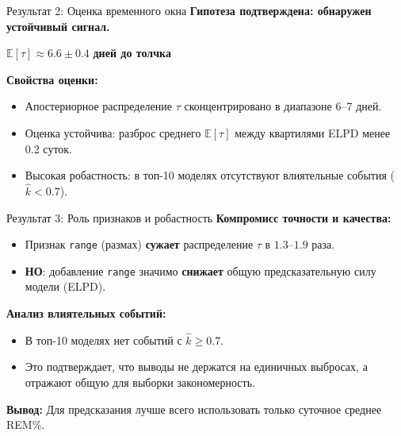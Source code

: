 \documentclass[12pt,aspectratio=169]{beamer}
\begin{document}
	\begin{frame}{Результат 2: Оценка временного окна}
		\textbf{Гипотеза подтверждена: обнаружен устойчивый сигнал.}
		
		\vspace{0.3cm}
		\begin{center}
			\large
			$\mathbb{E}[\tau] \approx \mathbf{6.6 \pm 0.4}$ \textbf{дней до толчка}
		\end{center}
		
		\vspace{0.3cm}
		\textbf{Свойства оценки:}
		\begin{itemize}
			\item Апостериорное распределение $\tau$ сконцентрировано в диапазоне 6--7 дней.
			\item Оценка устойчива: разброс среднего $\mathbb{E}[\tau]$ между квартилями ELPD менее 0.2 суток.
			\item Высокая робастность: в топ-10 моделях отсутствуют влиятельные события ($\hat{k} < 0.7$).
		\end{itemize}
	\end{frame}
	
	\begin{frame}{Результат 3: Роль признаков и робастность}
		\textbf{Компромисс точности и качества:}
		\begin{itemize}
			\item Признак \texttt{range} (размах) \textbf{сужает} распределение $\tau$ в $1.3$--$1.9$ раза.
			\item \textbf{НО}: добавление \texttt{range} значимо \textbf{снижает} общую предсказательную силу модели (ELPD).
		\end{itemize}
		
		\vspace{0.3cm}
		\textbf{Анализ влиятельных событий:}
		\begin{itemize}
			\item В топ-10 моделях нет событий с $\hat{k} \geq 0.7$.
			\item Это подтверждает, что выводы не держатся на единичных выбросах, а отражают общую для выборки закономерность.
		\end{itemize}
		
		\vspace{0.3cm}
		\textbf{Вывод:} Для предсказания лучше всего использовать только суточное среднее REM\%.
	\end{frame}
	
\end{document}
